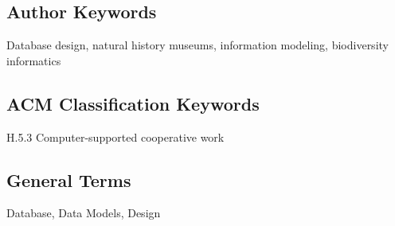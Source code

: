 \subsection{Author Keywords}
Database design, natural history museums, information modeling, biodiversity informatics
\subsection{ACM Classification Keywords}
H.5.3 Computer-supported cooperative work
\subsection{General Terms}
Database, Data Models, Design